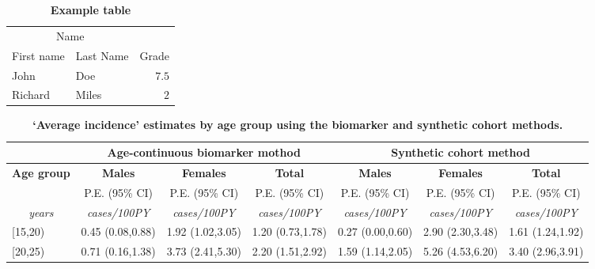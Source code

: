 \documentclass[a4paper,10pt,british]{article} %
\begin{document}
\begin{table}
\caption{{\bf Example table}}
\centering
\begin{tabular}{llr}
\toprule
\multicolumn{2}{c}{Name} \\
\cmidrule(r){1-2}
First name & Last Name & Grade \\
\midrule
John & Doe & $7.5$ \\
Richard & Miles & $2$ \\
\bottomrule
\end{tabular}
\end{table}

\begin{table}[!ht]
\begin{adjustwidth}{-20mm}{0mm} %
\caption{\bf ‘Average incidence’ estimates by age group using the biomarker and synthetic cohort methods.}
\centering
\begin{tabular}{|l|c|c|c|c|c|c|}
\hline
                                      & \multicolumn{3}{|c|}{\bf Age-continuous biomarker mothod} & \multicolumn{3}{|c|}{\bf Synthetic cohort method}    \\ \hline
\multicolumn{1}{|c|}{\bf Age group}   & {\bf Males}         & {\bf Females}       & {\bf Total}         & {\bf Males}         & {\bf Females}       & {\bf Total} \\
                                      & P.E. (95\% CI)      & P.E. (95\% CI)      & P.E. (95\% CI)      & P.E. (95\% CI)      & P.E. (95\% CI)      & P.E. (95\% CI) \\
\multicolumn{1}{|c|}{\emph{years}}    & \emph{cases/100PY}  & \emph{cases/100PY}  & \emph{cases/100PY}  & \emph{cases/100PY}  & \emph{cases/100PY}  & \emph{cases/100PY} \\ \hline %
[15,20)                               & 0.45 (0.08,0.88)    & 1.92 (1.02,3.05)    & 1.20 (0.73,1.78)    & 0.27 (0.00,0.60)    & 2.90 (2.30,3.48)    & 1.61 (1.24,1.92) \\ \hline
[20,25)                               & 0.71 (0.16,1.38)    & 3.73 (2.41,5.30)    & 2.20 (1.51,2.92)    & 1.59 (1.14,2.05)    & 5.26 (4.53,6.20)    & 3.40 (2.96,3.91) \\ \hline

\end{tabular}
\end{adjustwidth}
\end{table}
\end{document}
